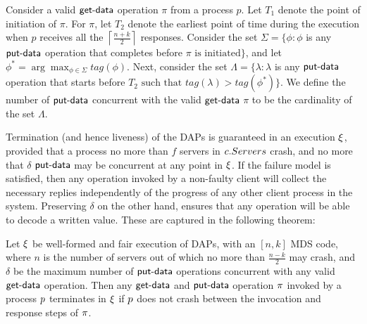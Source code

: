 				
				\begin{definition} \label{defn:concurrent}
					Consider a valid $\act{get-data}$ operation $\pi$ from a process $p$. 
					Let $T_1$ denote the point of initiation of $\pi$. For $\pi$, let $T_2$ denote the earliest point of time during the execution when $p$ 
					receives all the $\left\lceil \frac{n+k}{2} \right\rceil$ responses.
					Consider the set $\Sigma = \{ \phi: \phi$ is any $\act{put-data}$ operation that completes before $\pi \text{ is initiated} \}$, and let $\phi^* = \arg\max_{\phi \in \Sigma}tag(\phi)$. Next, consider the set $\Lambda = \{\lambda:  \lambda$  is any $\act{put-data}$ operation that starts before $T_2 \text{ such that } tag(\lambda) > tag(\phi^*)\}$. We define the number of $\act{put-data}$ concurrent with the valid $\act{get-data}$  $\pi$ to be the cardinality of the set $\Lambda$.
				\end{definition}
							
Termination (and hence liveness)  of the DAPs is guaranteed in an execution $\EX$, provided that a process 
	no more than $f$ servers in $c.Servers$ crash, and no more that $\delta$ $\act{put-data}$ may be concurrent at any point in $\EX$. 
	If the failure model is satisfied, then any operation invoked by a non-faulty client will collect the necessary replies
	independently of the progress of any other client process in the system. Preserving $\delta$ on the other hand,
	ensures that any operation will be able to decode a written value. These are captured in the following theorem:

\begin{theorem}[Liveness]  \label{thm:liveness_radonc}
Let $\EX$ be well-formed and fair execution of DAPs, with an $[n, k]$ MDS code, where $n$ is the number of servers out of which no more than $\frac{n-k}{2}$ may crash, 
and $\delta$ be the maximum number of $\act{put-data}$ operations concurrent with any valid $\act{get-data}$ operation. 
Then any $\act{get-data}$ and $\act{put-data}$ operation $\pi$ invoked by a process $p$  terminates in $\EX$ if $p$
does not crash between the invocation and response steps of $\pi$.\vspace{-.5em}
\end{theorem}
	
